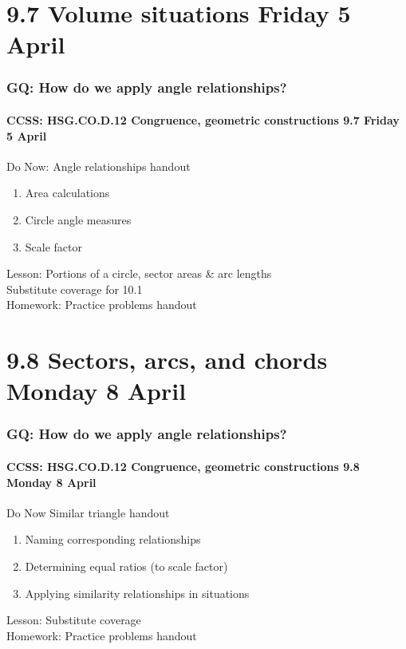 \documentclass{beamer}
\begin{document}
\section{9.7 Volume situations Friday 5 April}
  \frame
  {
    \frametitle{GQ: How do we apply angle relationships?}
    \framesubtitle{CCSS: HSG.CO.D.12 Congruence, geometric constructions \hfill \alert{9.7 Friday 5 April}}

    \begin{block}{Do Now: Angle relationships handout}
      \begin{enumerate}
        \item Area calculations
        \item Circle angle measures
        \item Scale factor
      \end{enumerate}
    \end{block}
    Lesson: Portions of a circle, sector areas \& arc lengths\\
    Substitute coverage for 10.1 \\[0.5cm]
    Homework: Practice problems handout
  }

\section{9.8 Sectors, arcs, and chords Monday 8 April}
  \frame
  {
    \frametitle{GQ: How do we apply angle relationships?}
    \framesubtitle{CCSS: HSG.CO.D.12 Congruence, geometric constructions \hfill \alert{9.8 Monday 8 April}}

    \begin{block}{Do Now Similar triangle handout}
      \begin{enumerate}
        \item Naming corresponding relationships
        \item Determining equal ratios (to scale factor)
        \item Applying similarity relationships in situations
      \end{enumerate}
    \end{block}
    Lesson: Substitute coverage\\
    Homework: Practice problems handout
  }
\end{document}
